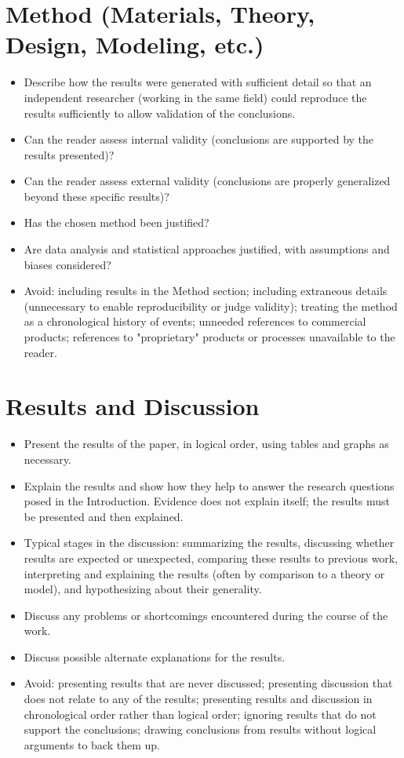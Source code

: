 \section*{Method (Materials, Theory, Design, Modeling, etc.)}
\begin{itemize}
  \item Describe how the results were generated with sufficient detail so that an independent researcher (working in the same field) could reproduce the results sufficiently to allow validation of the conclusions.
  \item Can the reader assess internal validity (conclusions are supported by the results presented)?
  \item Can the reader assess external validity (conclusions are properly generalized beyond these specific results)?
  \item Has the chosen method been justified?
  \item Are data analysis and statistical approaches justified, with assumptions and biases considered?
  \item Avoid: including results in the Method section; including extraneous details (unnecessary to enable reproducibility or judge validity); treating the method as a chronological history of events; unneeded references to commercial products; references to "proprietary" products or processes unavailable to the reader.
\end{itemize}

\section*{Results and Discussion}
\begin{itemize}
  \item Present the results of the paper, in logical order, using tables and graphs as necessary.
  \item Explain the results and show how they help to answer the research questions posed in the Introduction. Evidence does not explain itself; the results must be presented and then explained.
  \item Typical stages in the discussion: summarizing the results, discussing whether results are expected or unexpected, comparing these results to previous work, interpreting and explaining the results (often by comparison to a theory or model), and hypothesizing about their generality.
  \item Discuss any problems or shortcomings encountered during the course of the work.
  \item Discuss possible alternate explanations for the results.
  \item Avoid: presenting results that are never discussed; presenting discussion that does not relate to any of the results; presenting results and discussion in chronological order rather than logical order; ignoring results that do not support the conclusions; drawing conclusions from results without logical arguments to back them up.
\end{itemize}

